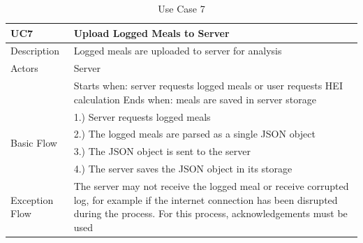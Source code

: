 \documentclass{article}
\begin{document}
\begin{appendicies}
\begin{table}[!htbp]
\centering
\hspace*{-0.5cm}
\begin{tabular}{||m{6cm}|m{6cm}||}
    \hline
    UC7 & Upload Logged Meals to Server\\
    \hline
    Description & Logged meals are uploaded to server for analysis\\
    \hline
    Actors & Server\\
    \hline
    & Starts when: server requests logged meals or user requests HEI calculation \newline
    Ends when: meals are saved in server storage\\
    \hline
    \multirow{4}{\hsize}{Basic Flow} 
                                    & 1.) Server requests logged meals\\
                                    & 2.) The logged meals are parsed as a single JSON object\\
                                    & 3.) The JSON object is sent to the server\\
                                    & 4.) The server saves the JSON object in its storage\\
    \hline
    Exception Flow & The server may not receive the logged meal or receive corrupted log, for example if the internet connection has been disrupted during the process. For this process, acknowledgements must be used\\
\hline
\end{tabular}
\caption{Use Case 7}
\label{table:UC7}
\end{table}


\end{appendicies}
\end{document}
